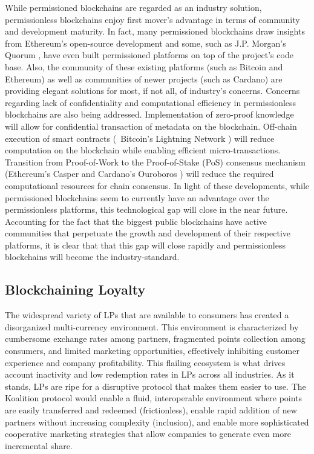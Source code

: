While permissioned blockchains are regarded as an industry solution, permissionless blockchains enjoy first mover's advantage in terms of community and development maturity. In fact, many permissioned blockchains draw insights from Ethereum's open-source development and some, such as J.P. Morgan's Quorum \cite{Quorum16}, have even built permissioned platforms on top of the project's code base. Also, the community of these existing platforms (such as Bitcoin and Ethereum) as well as communities of newer projects (such as Cardano) are providing elegant solutions for most, if not all, of industry's concerns. Concerns regarding lack of confidentiality and computational efficiency in permissionless blockchains are also being addressed. Implementation of zero-proof knowledge will allow for confidential transaction of metadata on the blockchain. Off-chain execution of smart contracts (\eg\ Bitcoin's Lightning Network \cite{Poon16}) will reduce computation on the blockchain while enabling efficient micro-transactions. Transition from Proof-of-Work to the Proof-of-Stake (PoS) consensus mechanism (Ethereum's Casper \cite{Vitalik17} and Cardano's Ouroboros \cite{Kiayias17}) will reduce the required computational resources for chain consensus. In light of these developments, while permissioned blockchains seem to currently have an advantage over the permissionless platforms, this technological gap will close in the near future. Accounting for the fact that the biggest public blockchains have active communities that perpetuate the growth and development of their respective platforms, it is clear that that this gap will close rapidly and permissionless blockchains will become the industry-standard. 


\subsection{Blockchaining Loyalty}

The widespread variety of LPs that are available to consumers has created a disorganized multi-currency environment. This environment is characterized by cumbersome exchange rates among partners, fragmented points collection among consumers, and limited marketing opportunities, effectively inhibiting customer experience and company profitability. This flailing ecosystem is what drives account inactivity and low redemption rates in LPs across all industries. As it stands, LPs are ripe for a disruptive protocol that makes them easier to use. The Koalition protocol would enable a fluid, interoperable environment where points are easily transferred and redeemed (frictionless), enable rapid addition of new partners without increasing complexity (inclusion), and enable more sophisticated cooperative marketing strategies that allow companies to generate even more incremental share.

